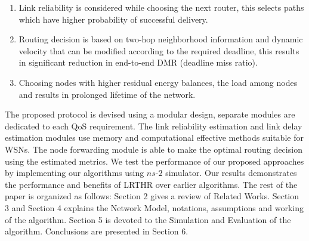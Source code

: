 \documentclass[fleqn,twoside]{article}
\begin{document}
\begin{enumerate}
\item
Link reliability is considered while choosing the next router, this selects paths which have higher probability of successful delivery.
\item
Routing decision is based on two-hop neighborhood information and dynamic velocity that can be modified according to the required deadline, this results in significant reduction in end-to-end DMR (deadline miss ratio).
\item
Choosing nodes with higher residual energy balances, the load among nodes and results in prolonged lifetime of the network.
\end{enumerate}
The proposed protocol is devised using a modular design, separate modules are dedicated to each QoS requirement. The
link reliability estimation and link delay estimation modules use memory and computational effective methods
suitable for WSNs. The node forwarding module is able to make the optimal routing decision using the estimated metrics. We test the performance of our proposed approaches by implementing our algorithms using $ns$-$2$ simulator. Our results
demonstrates the performance and benefits of LRTHR over earlier algorithms.
\vskip 2mm
The rest of the paper is organized as follows: Section 2 gives a review of Related Works. Section 3 and Section 4 explains the Network Model, notations, assumptions and working of the algorithm. Section 5 is devoted to the Simulation and Evaluation of the algorithm. Conclusions are presented in Section 6.
\end{document}
